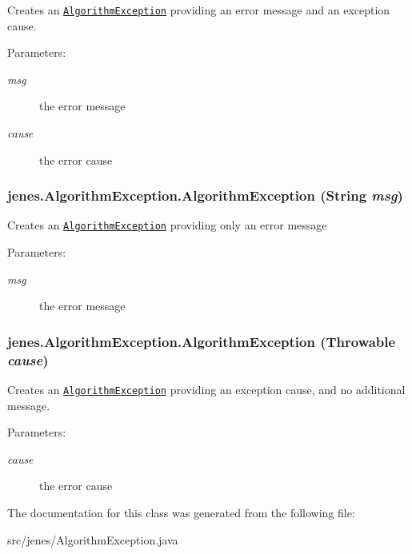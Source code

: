 Creates an {\tt \hyperlink{classjenes_1_1_algorithm_exception}{AlgorithmException}} providing an error message and an exception cause.

\begin{Desc}
\item[Parameters:]
\begin{description}
\item[{\em msg}]the error message \item[{\em cause}]the error cause \end{description}
\end{Desc}
\hypertarget{classjenes_1_1_algorithm_exception_295c243603f7b36f9ab5b0e1ec22aa60}{
\subsubsection[AlgorithmException]{\setlength{\rightskip}{0pt plus 5cm}jenes.AlgorithmException.AlgorithmException (String {\em msg})}}
\label{classjenes_1_1_algorithm_exception_295c243603f7b36f9ab5b0e1ec22aa60}


Creates an {\tt \hyperlink{classjenes_1_1_algorithm_exception}{AlgorithmException}} providing only an error message

\begin{Desc}
\item[Parameters:]
\begin{description}
\item[{\em msg}]the error message \end{description}
\end{Desc}
\hypertarget{classjenes_1_1_algorithm_exception_d6906756121d65db53ece1c1d9d8d0db}{
\subsubsection[AlgorithmException]{\setlength{\rightskip}{0pt plus 5cm}jenes.AlgorithmException.AlgorithmException (Throwable {\em cause})}}
\label{classjenes_1_1_algorithm_exception_d6906756121d65db53ece1c1d9d8d0db}


Creates an {\tt \hyperlink{classjenes_1_1_algorithm_exception}{AlgorithmException}} providing an exception cause, and no additional message.

\begin{Desc}
\item[Parameters:]
\begin{description}
\item[{\em cause}]the error cause \end{description}
\end{Desc}


The documentation for this class was generated from the following file:\begin{CompactItemize}
\item 
src/jenes/AlgorithmException.java\end{CompactItemize}
